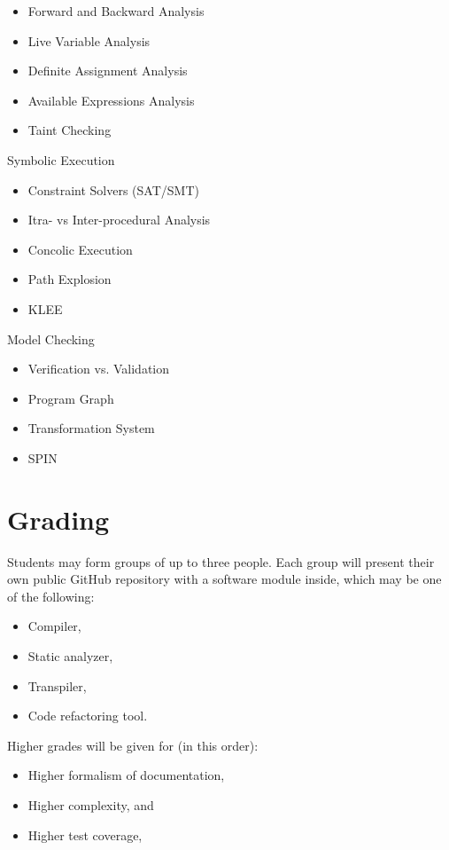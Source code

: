 \documentclass[nobrand,anonymous,nodate,nosecurity]{huawei}
\begin{document}
{\begin{lectures}
\begin{itemize}
	\item Forward and Backward Analysis
	\item Live Variable Analysis
	\item Definite Assignment Analysis
	\item Available Expressions Analysis
	\item Taint Checking
	\end{itemize}
\item Symbolic Execution
	\begin{itemize}
	\item Constraint Solvers (SAT/SMT)
	\item Itra- vs Inter-procedural Analysis
	\item Concolic Execution
	\item Path Explosion
	\item KLEE
	\end{itemize}
\item Model Checking
	\begin{itemize}
	\item Verification vs. Validation
	\item Program Graph
	\item Transformation System
	\item SPIN
	\end{itemize}
\end{lectures}

\newpage
\section*{Grading}

Students may form groups of up to three people. Each group will present
their own public GitHub repository with a software module inside, which
may be one of the following:

\begin{itemize}
	\item Compiler,
	\item Static analyzer,
	\item Transpiler,
	\item Code refactoring tool.
\end{itemize}

Higher grades will be given for (in this order):

\begin{itemize}
	\item Higher formalism of documentation,
	\item Higher complexity,
	and
	\item Higher test coverage,
\end{itemize}

}
\end{document}
